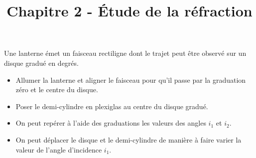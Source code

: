\documentclass[a4paper,12pt]{article}
\title{\vspace{-1cm}\Large \textbf{Chapitre 2 - Étude de la réfraction}}
\date{}
\begin{document}
\maketitle
\vspace{-2cm}
Une lanterne émet un faisceau rectiligne dont le trajet peut être observé sur un disque gradué en degrés.
\begin{itemize}
	\item Allumer la lanterne et aligner le faisceau pour qu’il passe par la graduation zéro et le centre du disque.
    \item Poser le demi-cylindre en plexiglas au centre du disque gradué.
    \item On peut repérer à l’aide des graduations les valeurs des angles $i_1$ et $i_2$.
    \item On peut déplacer le disque et le demi-cylindre de manière à faire varier la valeur de l’angle d’incidence $i_1$.
   \end{itemize}
\end{document}

